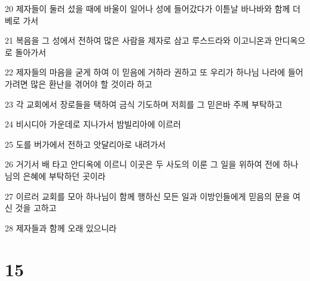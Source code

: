 \par 20 제자들이 둘러 섰을 때에 바울이 일어나 성에 들어갔다가 이튿날 바나바와 함께 더베로 가서
\par 21 복음을 그 성에서 전하여 많은 사람을 제자로 삼고 루스드라와 이고니온과 안디옥으로 돌아가서
\par 22 제자들의 마음을 굳게 하여 이 믿음에 거하라 권하고 또 우리가 하나님 나라에 들어가려면 많은 환난을 겪어야 할 것이라 하고
\par 23 각 교회에서 장로들을 택하여 금식 기도하며 저희를 그 믿은바 주께 부탁하고
\par 24 비시디아 가운데로 지나가서 밤빌리아에 이르러
\par 25 도를 버가에서 전하고 앗달리아로 내려가서
\par 26 거기서 배 타고 안디옥에 이르니 이곳은 두 사도의 이룬 그 일을 위하여 전에 하나님의 은혜에 부탁하던 곳이라
\par 27 이르러 교회를 모아 하나님이 함께 행하신 모든 일과 이방인들에게 믿음의 문을 여신 것을 고하고
\par 28 제자들과 함께 오래 있으니라

\chapter{15}

